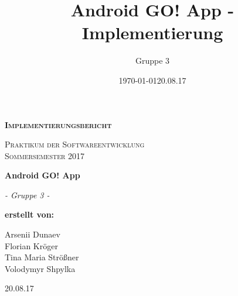\documentclass[11pt,a4paper]{scrartcl}
\date{\today}
\title{Android GO! App - Implementierung}
\author{Gruppe 3}
\date{20.08.17}
\begin{document}
\begin{titlepage}
	\begin{center}
	{\scshape\LARGE \bfseries Implementierungsbericht \par}
	\vspace{1cm}
	{\scshape\Large Praktikum der Softwareentwicklung \\ Sommersemester 2017\par}
	\vspace{1.5cm}
	{\huge\bfseries Android GO! App\par}
	\vspace{2cm}
	{\Large\itshape - Gruppe 3 -\par}
	\vfill
	{\bfseries erstellt von:\par}
	Arsenii Dunaev \\
	Florian Kröger \\
	Tina Maria Strößner \\
	Volodymyr Shpylka \\	
	\vfill
	{\large 20.08.17 \par}	
	\end{center}
\end{titlepage}

\newpage

\tableofcontents

\newpage
\end{document}
